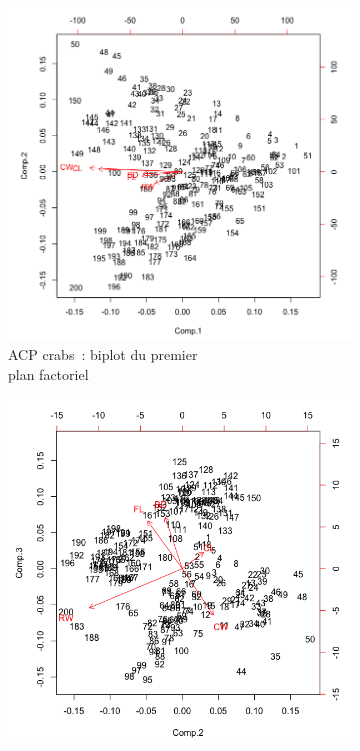 \documentclass[a4paper,10pt]{report}
\begin{document}
\begin{figure}[H]
	\centering
	\captionsetup{justification=centering, margin=2cm}
	\begin{subfigure}[b]{0.5\linewidth}
		\centering
		\captionsetup{justification=centering, margin=1cm}
		\includegraphics[width=1\columnwidth]{img/2-3-1-biplot-acp-crabs-plan-1-2}
		\caption{\scriptsize ACP crabs~: biplot du premier \\plan factoriel}
		\label{fig:biplot_acp_crabs_plan_1_2}
	\end{subfigure}%
	\begin{subfigure}[b]{0.5\linewidth}
		\centering
		\captionsetup{justification=centering, margin=1cm}
		\includegraphics[width=1\columnwidth]{img/2-3-1-biplot-acp-crabs-plan-2-3}

\end{subfigure}
\end{figure}
\end{document}

